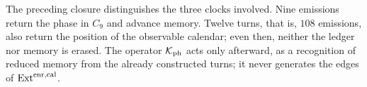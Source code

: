 The preceding closure distinguishes the three clocks involved. Nine emissions
return the phase in \(C_9\) and advance memory. Twelve turns, that is,
\(108\) emissions, also return the position of the observable calendar; even
then, neither the ledger nor memory is erased. The operator
\(\mathcal K_{\rm ph}\) acts only afterward, as a recognition of reduced
memory from the already constructed turns; it never generates the edges of
\(\operatorname{Ext}^{\rm enr,cal}\).
